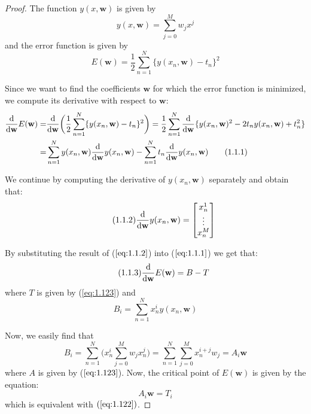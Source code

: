 \begin{proof}
    The function $y(x, \mathbf{w})$ is given by
    \begin{equation*}\label{eq:1.1}\tag{1.1}
        y(x, \mathbf{w}) = \sum_{j = 0}^M w_j x^j
    \end{equation*}
    and the error function is given by
    \begin{equation*}\label{eq:1.2}\tag{1.2}
        E(\mathbf{w}) = \frac{1}{2} \sum_{n = 1}^N \{y(x_n, \mathbf{w}) - t_n\}^2
    \end{equation*}

    Since we want to find the coefficients $\mathbf{w}$ for which
    the error function is minimized, we compute its derivative with
    respect to $\mathbf{w}$:
    \begin{align*}
        \dv{\mathbf{w}} E(\mathbf{w}) 
        =& \dv{\mathbf{w}} \bigg(\frac{1}{2} \sum_{n = 1}^N \{y(x_n, \mathbf{w}) - t_n\}^2\bigg)
        = \frac{1}{2} \sum_{n = 1}^{N} \dv{\mathbf{w}} \{y(x_n, \mathbf{w})^2 - 2t_ny(x_n, \mathbf{w}) + t_n^2\} \\
        =& \sum_{n = 1}^N y(x_n, \mathbf{w}) \dv{\mathbf{w}} y(x_n, \mathbf{w})
            - \sum_{n = 1}^N t_n \dv{\mathbf{w}} y(x_n, \mathbf{w}) \label{eq:1.1.1}\tag{1.1.1}
    \end{align*}

    We continue by computing the derivative of $y(x_n, \mathbf{w})$ separately and obtain that:
    \begin{equation}\label{eq:1.1.2}\tag{1.1.2}
        \dv{\mathbf{w}} y(x_n, \mathbf{w}) 
        = \begin{bmatrix}
            x_n^1 \\
            \vdots \\
            x_n^M
        \end{bmatrix}
    \end{equation}

    By substituting the result of ($\ref{eq:1.1.2}$) into ($\ref{eq:1.1.1}$) we get that:
    \begin{equation}\label{eq:1.1.3}\tag{1.1.3}
        \dv{\mathbf{w}} E(\mathbf{w}) = B - T
    \end{equation}
    where $T$ is given by (\ref{eq:1.123}) and
    \[
        B_i = \sum_{n = 1}^{N} x_n^i y(x_n, \mathbf{w})  
    \] 

    Now, we easily find that
    \[
        B_i = \sum_{n = 1}^{N} \bigg(x_n^i \sum_{j = 0}^M w_j x_n^j\bigg)
        = \sum_{n = 1}^{N} \sum_{j = 0}^M x_n^{i + j} w_j
        = A_i \mathbf{w}
    \] 
    where $A$ is given by ($\ref{eq:1.123}$). Now, the critical point of $E(\mathbf{w})$ 
    is given by the equation:
    \[
        A_i \mathbf{w} = T_i
    \] 
    which is equivalent with $(\ref{eq:1.122})$.
\end{proof}

